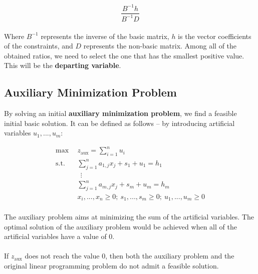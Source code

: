 \documentclass{article}
\begin{document}
\[ \frac{B^{-1}h}{B^{-1}D} \] \\
Where $B^{-1}$ represents the inverse of the basic matrix, $h$ is the vector coefficients of the constraints, and $D$ represents the non-basic matrix. Among all of the obtained ratios, we need to select the one that has the smallest positive value. This will be the \textbf{departing variable}.

\subsection{Auxiliary Minimization Problem}
By solving an initial \textbf{auxiliary minimization problem}, we find a feasible initial basic solution. It can be defined as follows -- by introducing artificial variables $u_1, ..., u_m$:

\begin{align*}
	\max~~ & z_{\text{aux}} = \sum_{i = 1}^n u_i \\
	\text{s.t.}~~ & \sum_{j = 1}^n a_{1,j}x_j+s_1+u_1 = h_1 \\
	~~&~~ \vdots \\
	~~& \sum_{j = 1}^n a_{m,j}x_j+s_m+u_m = h_m \\
	~~& x_i, ..., x_n \geq 0;~ s_1, ..., s_m \geq 0;~ u_1, ..., u_m \geq 0
\end{align*} \\
The auxiliary problem aims at minimizing the sum of the artificial variables. The optimal solution of the auxiliary problem would be achieved when all of the artificial variables have a value of 0. \\ \\
If $z_{\text{aux}}$ does not reach the value 0, then both the auxiliary problem and the original linear programming problem do not admit a feasible solution.
\end{document}
